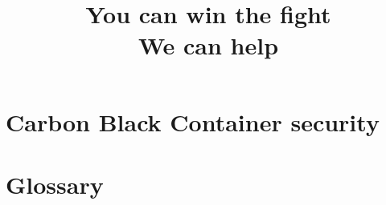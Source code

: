 \documentclass[12pt,letterpaper]{report}
\begin{document}
\chapter{Carbon Black Container security}


%

%

\chapter{Glossary}

\printglossaries

\newpage
\thispagestyle{empty}
\bannercbcontainer
\vspace{2cm}
\title{You can win the fight\\We can help}

\logocbcontainer
\end{document}
